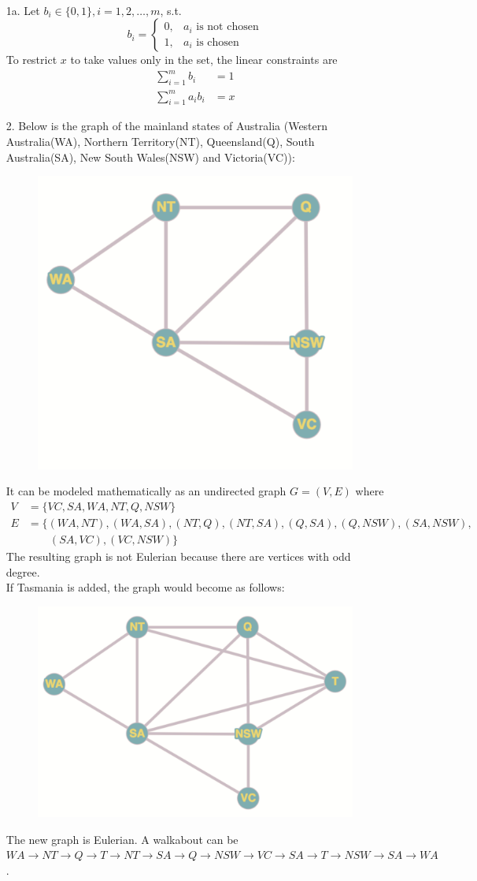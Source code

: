 \documentclass[10pt]{report}
\title{
	\courseTitle\\
	\hwNo\\
	\hwDate
}
\author{\hwAuther}
\date{}
\begin{document}
\maketitle

\begin{enumerate}
	\item [1a.]
	Let $b_i \in \{0,1\}, i=1,2,\dots,m$, s.t.
	\[
	b_i = 
	\begin{cases}
		0, & a_i \text{ is not chosen}\\
		1, & a_i \text{ is chosen}
	\end{cases}
	\]
	To restrict $x$ to take values only in the set, the linear constraints are
	\begin{align*}
		\sum_{i=1}^{m} b_i &= 1\\
		\sum_{i=1}^{m} a_i b_i &= x
	\end{align*}
	
	\item [2.]
	Below is the graph of the mainland states of Australia (Western Australia(WA), Northern Territory(NT), Queensland(Q), South Australia(SA), New South Wales(NSW) and Victoria(VC)):
	\begin{figure}[H]
		\centering
		\includegraphics[width=0.35\linewidth]{2-1.png}
	\end{figure}
	It can be modeled mathematically as an undirected graph $G=(V, E)$ where
	\begin{align*}
		V &= \{VC, SA, WA, NT, Q, NSW\}\\
		E &= \{(WA, NT), (WA, SA), (NT, Q), (NT, SA), (Q, SA), (Q, NSW), (SA, NSW), \\
		&\qquad (SA, VC), (VC, NSW)\}
	\end{align*}
	The resulting graph is not Eulerian because there are vertices with odd degree.\\
	If Tasmania is added, the graph would become as follows:
	\begin{figure}[H]
		\centering
		\includegraphics[width=0.4\linewidth]{2-2.png}
	\end{figure}
	The new graph is Eulerian. A walkabout can be $WA \to NT \to Q \to T \to NT \to SA \to Q \to NSW \to VC \to SA \to T \to NSW \to SA \to WA$.
	

\end{enumerate}
\end{document}
